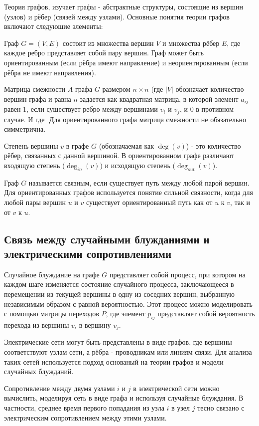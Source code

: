 \documentclass{article}
\begin{document}
Теория графов, изучает графы - абстрактные структуры, состоящие из вершин (узлов) и рёбер (связей между узлами). Основные понятия теории графов включают следующие элементы:

Граф \(G = (V, E)\) состоит из множества вершин \(V\) и множества рёбер \(E\), где каждое ребро представляет собой пару вершин. Граф может быть ориентированным (если рёбра имеют направление) и неориентированным (если рёбра не имеют направления).

Матрица смежности \(A\) графа \(G\) размером \(n \times n\) (где \(|V|\) обозначает количество вершин графа и равна \(n\) задается как квадратная матрица, в которой элемент \(a_{ij}\) равен 1, если существует ребро между вершинами \(v_i\) и \(v_j\), и 0 в противном случае. И где \(\) Для ориентированного графа матрица смежности не обязательно симметрична\cite{7}.

Степень вершины \(v\) в графе \(G\) (обозначаемая как \(\deg(v)\)) - это количество рёбер, связанных с данной вершиной. В ориентированном графе различают входящую степень (\(\deg_{in}(v)\)) и исходящую степень (\(\deg_{out}(v)\))\cite{6}.

Граф \(G\) называется связным, если существует путь между любой парой вершин. Для ориентированных графов используется понятие сильной связности, когда для любой пары вершин \(u\) и \(v\) существует ориентированный путь как от \(u\) к \(v\), так и от \(v\) к \(u\)\cite{8}.

\subsection{Связь между случайными блужданиями и электрическими сопротивлениями}

Случайное блуждание на графе \(G\) представляет собой процесс, при котором на каждом шаге изменяется состояние случайного процесса, заключающееся в перемещении из текущей вершины в одну из соседних вершин, выбранную независимым образом с равной вероятностью. Этот процесс можно моделировать с помощью матрицы переходов \(P\), где элемент \(p_{ij}\) представляет собой вероятность перехода из вершины \(v_i\) в вершину \(v_j\).

Электрические сети могут быть представлены в виде графов, где вершины соответствуют узлам сети, а рёбра - проводникам или линиям связи. Для анализа таких сетей используется подход основаный на теории графов и модели случайных блужданий.

Сопротивление между двумя узлами \(i\) и \(j\) в электрической сети можно вычислить, моделируя сеть в виде графа и используя случайные блуждания. В частности, среднее время первого попадания из узла \(i\) в узел \(j\) тесно связано с электрическим сопротивлением между этими узлами.
\end{document}
